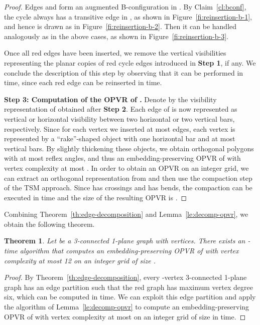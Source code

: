 \documentclass{article}
\newtheorem{theorem}{Theorem}
\newcommand{\opvr}{OPVR\xspace}
\begin{document}
\begin{proof}
\smallskip{}  Edges  and  form an augmented B-configuration in . By Claim~\ref{cl:bconf}, the cycle  always has a transitive edge in , as shown in Figure~\ref{fi:reinsertion-b-1}, and hence is drawn as in Figure~\ref{fi:reinsertion-b-2}. Then it can be handled analogously as in the above cases, as shown in Figure~\ref{fi:reinsertion-b-3}.

Once all red edges have been inserted, we remove the vertical visibilities representing the planar copies of red cycle edges introduced in \textbf{Step 1}, if any. We conclude the description of this step by observing that it can be performed in  time, since each red edge can be reinserted in  time. 

\smallskip\noindent\textbf{Step 3: Computation of the \opvr of .} Denote by  the visibility representation of  obtained after {\bf Step 2}. Each edge of  is now represented as vertical or horizontal visibility between two horizontal or two vertical bars, respectively. Since for each vertex we inserted at most   edges, each vertex is represented by a ``rake''-shaped object with one horizontal bar and at most  vertical bars. By slightly thickening these objects, we obtain orthogonal polygons with at most  reflex angles, and thus an embedding-preserving \opvr  of  with vertex complexity at most . In order to obtain an \opvr on an integer grid, we can extract an orthogonal representation  from  and then use the compaction step of the TSM approach. Since  has  crossings and  has  bends, the compaction can be executed in  time and the size of the resulting \opvr is .
\end{proof}

Combining Theorem~\ref{th:edge-decomposition} and Lemma~\ref{le:decomp-opvr}, we obtain the following theorem.

\begin{theorem}\label{th:decomp-opvr}
Let  be a 3-connected 1-plane graph with  vertices. There exists an -time algorithm that computes an embedding-preserving \opvr of  with vertex complexity at most 12 on an integer grid of size .
\end{theorem}
\begin{proof}
By Theorem~\ref{th:edge-decomposition}, every -vertex 3-connected 1-plane graph has an edge partition such that the red graph has maximum vertex degree six, which can be computed in  time. We can exploit this edge partition and apply the algorithm of Lemma~\ref{le:decomp-opvr} to compute an embedding-preserving \opvr of  with vertex complexity at most  on an integer grid of size  in  time.
\end{proof}
\end{document}
